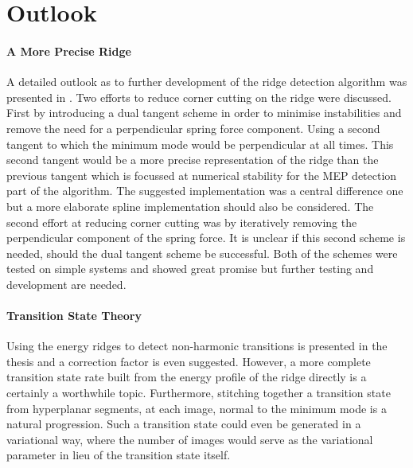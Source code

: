 \section{Outlook}
\label{sec:summary-outlook}


\paragraph{A More Precise Ridge}
A detailed outlook as to further development of the ridge detection algorithm was presented in .
Two efforts to reduce corner cutting on the ridge were discussed.
First by introducing a dual tangent scheme in order to minimise instabilities and remove the need for a perpendicular spring force component.
Using a second tangent to which the minimum mode would be perpendicular at all times.
This second tangent would be a more precise representation of the ridge than the previous tangent which is focussed at numerical stability for the MEP detection part of the algorithm.
The suggested implementation was a central difference one but a more elaborate spline implementation should also be considered.
The second effort at reducing corner cutting was by iteratively removing the perpendicular component of the spring force.
It is unclear if this second scheme is needed, should the dual tangent scheme be successful.
Both of the schemes were tested on simple systems and showed great promise but further testing and development are needed.

\paragraph{Transition State Theory}
Using the energy ridges to detect non-harmonic transitions is presented in the thesis and a correction factor is even suggested.
However, a more complete transition state rate built from the energy profile of the ridge directly is a certainly a worthwhile topic.
Furthermore, stitching together a transition state from hyperplanar segments, at each image, normal to the minimum mode is a natural progression.
Such a transition state could even be generated in a variational way, where the number of images would serve as the variational parameter in lieu of the transition state itself.

